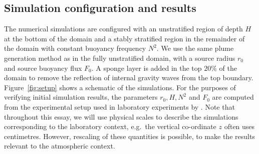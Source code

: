 \documentclass[a4paper]{article}
\begin{document}
\subsection{Simulation configuration and results}
The numerical simulations are configured with an unstratified region of depth $H$ at the bottom of the domain
and a stably stratified region in the remainder of the domain with constant buoyancy frequency $N^2$. We use
the same plume generation method as in the fully unstratified domain, with a source radius $r_0$ and source
buoyancy flux $F_0$. A sponge layer is added in the top $20\%$ of the domain to remove the reflection of
internal gravity waves from the top boundary. Figure~\ref{fig:setup} shows a schematic of the simulations. For
the purposes of verifying initial simulation results, the parameters $r_0, H, N^2$ and $F_0$ are computed from
the experimental setup used in laboratory experiments by \citet{ansong2008}. Note that throughout this essay,
we will use physical scales to describe the simulations corresponding to the laboratory context, e.g.\ the
vertical co-ordinate $z$ often uses centimetres. However, rescaling of these quantities is possible, to make
the results relevant to the atmospheric context.
\end{document}
